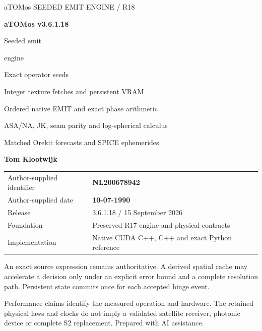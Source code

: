 

\begin{titlepage}\thispagestyle{empty}
{\sffamily\color{accent}\large aTOMos \hfill SEEDED EMIT ENGINE / R18}\par
\vspace{19mm}
{\sffamily\bfseries\fontsize{40}{48}\selectfont\color{ink}aTOMos v3.6.1.18}\par
\vspace{10mm}
{\sffamily\fontsize{34}{41}\selectfont Seeded emit\par engine}\par
\vspace{10mm}
{\sffamily\fontsize{19}{25}\selectfont\color{gold}Exact operator seeds\par Integer texture fetches and persistent VRAM}\par
\vspace{12mm}
{\large Ordered native EMIT and exact phase arithmetic\par
ASA/NA, JK, seam parity and log-spherical calculus\par
Matched Orekit forecasts and SPICE ephemerides}\par
\vspace{15mm}
{\sffamily\bfseries\Large Tom Klootwijk}\par
\begin{tabular}{@{}ll@{}}
Author-supplied identifier & \textbf{NL200678942}\\
Author-supplied date & \textbf{10-07-1990}\\
Release & 3.6.1.18 / 15 September 2026\\
Foundation & Preserved R17 engine and physical contracts\\
Implementation & Native CUDA C++, C++ and exact Python reference\\
\end{tabular}
\vfill
\begin{panel}
An exact source expression remains authoritative. A derived spatial cache
may accelerate a decision only under an explicit error bound and a complete
resolution path. Persistent state commits once for each accepted hinge event.
\end{panel}
{\small\color{muted}Performance claims identify the measured operation and
hardware. The retained physical laws and clocks do not imply a validated
satellite receiver, photonic device or complete S2 replacement. Prepared with AI assistance.}
\end{titlepage}
\setcounter{page}{2}
